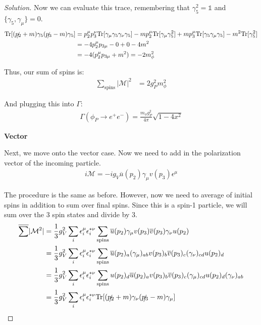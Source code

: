 \documentclass[12pt]{article}
\newenvironment{solution}{\begin{proof}[Solution]}{\end{proof}}
\begin{document}
\begin{solution}
Now we can evaluate this trace, remembering that $\gamma_5^2=\mathbb{1}$ and $\{\gamma_5,\gamma_\mu\}=0$.
\begin{align*}
    \text{Tr}[(\slashed{p_2}+m)\gamma_5 (\slashed{p_3}-m)\gamma_5] &= p_2^\mu p_3^\nu \text{Tr}[\gamma_\mu \gamma_5 \gamma_\nu \gamma_5]-mp_2^\mu\text{Tr}[\gamma_\mu \gamma_5^2]+mp_3^\mu\text{Tr}[\gamma_5\gamma_\mu\gamma_5]-m^2\text{Tr}[\gamma_5^2] \\
    &= -4 p_2^\mu p_{3\mu}-0+0-4m^2 \\
    &= -4(p_2^\mu p_{3\mu}+m^2) = -2m_\phi^2
\end{align*}

Thus, our sum of spins is:
\begin{align*}
    \sum_{\text{spins}} |\mathcal{M}|^2&=2g_P^2m_\phi^2
\end{align*}

And plugging this into $\Gamma$:
\begin{align*}
    \Gamma(\phi_P\rightarrow e^+e^-)=\frac{m_\phi g_P^2}{4\pi}\sqrt{1-4x^2}
\end{align*}

\textbf{Vector}

Next, we move onto the vector case. Now we need to add in the polarization vector of the incoming particle. 
\begin{align*}
    i\mathcal{M}=-ig_V\overline{u}(p_2)\gamma_\mu v(p_3) \epsilon^\mu
\end{align*}

The procedure is the same as before. However, now we need to average of initial spins in addition to sum over final spins. Since this is a spin-1 particle, we will sum over the 3 spin states and divide by 3.
\begin{align*}
    \overline{\sum}|\mathcal{M}^2|&=\frac{1}{3}g_V^2\sum_i\epsilon_i^\mu \epsilon_i^{*\nu} \sum_\text{spins}\overline{u}(p_2)\gamma_\mu v(p_3)\overline{v}(p_3)\gamma_\nu u(p_2) \\
    &= \frac{1}{3}g_V^2\sum_i\epsilon_i^\mu \epsilon_i^{*\nu}\sum_{\text{spins}}\overline{u}(p_2)_a(\gamma_\mu)_{ab}v(p_3)_b \overline{v}(p_3)_c (\gamma_\nu)_{cd}u(p_2)_d \\
    &= \frac{1}{3}g_V^2\sum_i\epsilon_i^\mu \epsilon_i^{*\nu}\sum_{\text{spins}}u(p_2)_d\overline{u}(p_2)_av(p_3)_b \overline{v}(p_3)_c(\gamma_\mu)_{cd}u(p_2)_d(\gamma_\nu)_{ab} \\
    &= \frac{1}{3}g_V^2\sum_i\epsilon_i^\mu \epsilon_i^{*\nu}\text{Tr}[(\slashed{p_2}+m)\gamma_\nu (\slashed{p_3}-m)\gamma_\mu]
\end{align*}


\end{solution}
\end{document}
